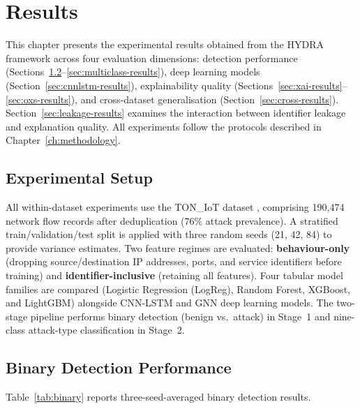 \documentclass[12pt,a4paper]{report}
\begin{document}
\chapter{Results}
\label{ch:results}

This chapter presents the experimental results obtained from the HYDRA framework across four evaluation dimensions: detection performance (Sections~\ref{sec:binary-results}--\ref{sec:multiclass-results}), deep learning models (Section~\ref{sec:cnnlstm-results}), explainability quality (Sections~\ref{sec:xai-results}--\ref{sec:oxs-results}), and cross-dataset generalisation (Section~\ref{sec:cross-results}). Section~\ref{sec:leakage-results} examines the interaction between identifier leakage and explanation quality. All experiments follow the protocols described in Chapter~\ref{ch:methodology}.

\section{Experimental Setup}
\label{sec:setup}

All within-dataset experiments use the TON\_IoT dataset \cite{alsaedi2020}, comprising 190,474 network flow records after deduplication (76\% attack prevalence). A stratified train/validation/test split is applied with three random seeds (21, 42, 84) to provide variance estimates. Two feature regimes are evaluated: \textbf{behaviour-only} (dropping source/destination IP addresses, ports, and service identifiers before training) and \textbf{identifier-inclusive} (retaining all features). Four tabular model families are compared (Logistic Regression (LogReg), Random Forest, XGBoost, and LightGBM) alongside CNN-LSTM and GNN deep learning models. The two-stage pipeline performs binary detection (benign vs.\ attack) in Stage~1 and nine-class attack-type classification in Stage~2.

\section{Binary Detection Performance}
\label{sec:binary-results}

Table~\ref{tab:binary} reports three-seed-averaged binary detection results.
\end{document}
